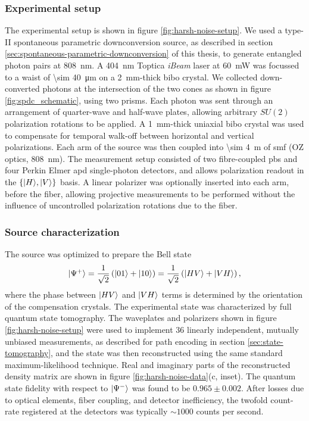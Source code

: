 \subsubsection{Experimental setup} 
The experimental setup is shown in figure \ref{fig:harsh-noise-setup}.
We used a type-II spontaneous parametric downconversion source, as described in section \ref{sec:spontaneous-parametric-downconversion} of this thesis, to generate entangled photon pairs at \SI{808}{\nano \metre}. A \SI{404}{\nano \metre} Toptica \emph{iBeam} laser at \SI{60}{\milli \watt} was focussed to a waist of \SI{\sim 40}{\micro \metre} on a \SI{2}{mm}-thick \acrshort{bibo} crystal. We collected down-converted photons at the intersection of the two cones as shown in figure \ref{fig:spdc_schematic}, using two prisms. Each photon was sent through an arrangement of quarter-wave and half-wave plates, allowing arbitrary $SU(2)$ polarization rotations to be applied. A \SI{1}{\milli \metre}-thick uniaxial \acrshort{bibo} crystal was used to compensate for temporal walk-off between horizontal and vertical polarizations. Each arm of the source was then coupled into \SI{\sim 4}{\metre} of \acrshort{smf} (OZ optics, \SI{808}{\nano \metre}). The measurement setup consisted of two fibre-coupled \gls{pbs} and four Perkin Elmer \gls{apd} single-photon detectors, and allows polarization readout in the $\{\mbox{$ | H \rangle $}, \mbox{$ | V \rangle $}\}$ basis. A linear polarizer was optionally inserted into each arm, before the fiber, allowing projective measurements to be performed without the influence of uncontrolled polarization rotations due to the fiber.

\subsubsection{Source characterization} 
The source was optimized to prepare the Bell state 
\begin{equation}
   \mbox{$ | \Psi^+ \rangle $} = \frac{1}{\sqrt{2}}\left(\mbox{$ | 01 \rangle $}+\mbox{$ | 10 \rangle $}\right) =
\frac{1}{\sqrt{2}}\left(\mbox{$ | HV \rangle $}+\mbox{$ | VH \rangle $}\right),
\label{eqn:spdc-bell}
\end{equation} 
where the phase between $\mbox{$ | HV \rangle $}$ and $\mbox{$ | VH \rangle $}$ terms is determined by the orientation of the compensation crystals. The experimental state was characterized by full quantum state tomography. The waveplates and polarizers shown in figure \ref{fig:harsh-noise-setup} were used to implement 36 linearly independent, mutually unbiased measurements, as described for path encoding in section \ref{sec:state-tomography}, and the state was then reconstructed using the same standard maximum-likelihood technique. Real and imaginary parts of the reconstructed density matrix are shown in figure \ref{fig:harsh-noise-data}(c, inset). The quantum state fidelity with respect to $\mbox{$ | \Psi^- \rangle $}$ was found to be $0.965 \pm 0.002$.  After losses due to optical elements, fiber coupling, and detector inefficiency, the twofold count-rate registered at the detectors was typically $\sim 1000$ counts per second.

